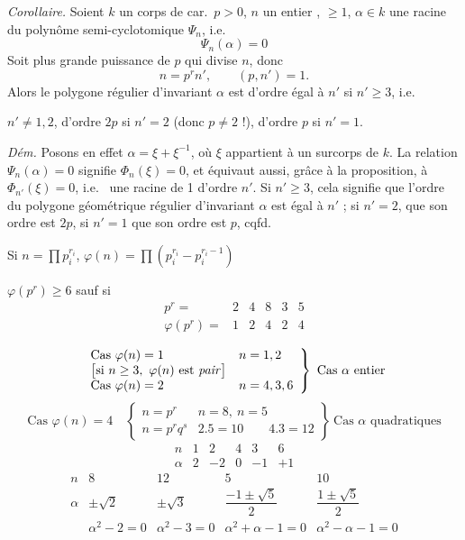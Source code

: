 \documentclass[11pt,a4paper]{article}
\begin{document}
\emph{Corollaire.} Soient $k$ un corps de car.\ $p > 0$, $n$ un entier , $\geq 1$, $\alpha \in k$ une racine du polynôme semi-cyclotomique $\Psi_n$, i.e.
\[
  \Psi_n(\alpha) = 0
\]
Soit    plus grande puissance de $p$ qui divise $n$, donc
\[
  n = p^r n', \qquad (p, n') = 1.
\]
Alors le polygone régulier d'invariant $\alpha$ est d'ordre égal à $n'$ si $n' \geq 3$, i.e.

$n' \neq 1, 2$, d'ordre $2p$ si $n' = 2$ (donc $p \neq 2$ !), d'ordre $p$ si $n' = 1$.

\emph{Dém.} Posons en effet $\alpha = \xi + \xi^{-1}$, où $\xi$ appartient à un surcorps de $k$. La relation $\Psi_n(\alpha) = 0$ signifie $\Phi_n(\xi) = 0$, et équivaut aussi, grâce à la proposition, à $\Phi_{n'}(\xi) = 0$,  i.e.\  une racine de 1 d'ordre $n'$. Si  $n' \geq 3$, cela signifie que l'ordre du polygone géométrique régulier d'invariant $\alpha$ est égal à $n'$ ; si $n' = 2$, que son ordre est $2p$, si $n' = 1$ que son ordre est $p$, cqfd.


\struck{$\varphi$} Si $n = \prod p_i^{r_i}$, $\varphi(n) = \prod (p_i^{r_i} - p_i^{r_i - 1})$

$\varphi(p^r) \geq 6$ sauf si
\[
  \begin{array}{r|c|c|c||c||c}
    p^r = & 2 & 4 & 8 & 3 & 5\\ \hline
    \varphi(p^r) = & 1 & 2 & 4 & 2 & 4
  \end{array}
\]

\[
  \left.
  \begin{array}{ll}
    \text{Cas } \varphi(n) = 1 & n = 1, 2\\
    \bigl[\text{si } n \geq 3,\ \varphi(n) \text{ est \textit{pair}}\bigr] & \\
    \text{Cas } \varphi(n) = 2 & n = 4, 3, 6
  \end{array}
  \right\} \ \text{Cas } \alpha \text{ entier}
\]
\[
  \left.
  \text{Cas } \varphi(n) = 4 \quad
  \left\{
  \begin{array}{ll}
    n = p^r & n = 8,\ n = 5\\
    n = p^r q^s & 2.5 = 10 \qquad 4.3 = 12
  \end{array}
  \right.
  \right\} \ \text{Cas } \alpha \text{ quadratiques}
\]
\[
  \begin{array}{c|c|c|c||c|c||}
    n & 1 & 2 & 4 & 3 & 6\\ \hline
    \alpha & 2 & -2 & 0 & -1 & +1
  \end{array}
\]
\[
  \begin{array}{c|c||c||c|c||}
    n & 8 & 12 & 5 & 10\\ \hline
    \alpha & \pm\sqrt{2} & \pm\sqrt{3} & \dfrac{-1 \pm \sqrt{5}}{2} & \dfrac{1 \pm \sqrt{5}}{2}\\
    & \alpha^2 - 2 = 0 & \alpha^2 - 3 = 0 & \alpha^2 + \alpha - 1 = 0 & \alpha^2 - \alpha - 1 = 0
  \end{array}
\]
\end{document}
